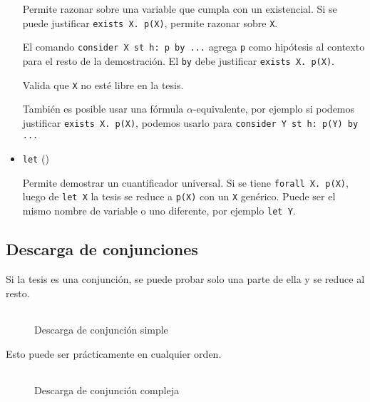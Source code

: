 \begin{itemize}
    Permite razonar sobre una variable que cumpla con un existencial. Si se
    puede justificar \lstinline{exists X. p(X)}, permite razonar sobre
    \lstinline{X}.

    El comando \lstinline{consider X st h: p by ...} agrega \lstinline{p} como
    hipótesis al contexto para el resto de la demostración. El \lstinline{by}
    debe justificar \lstinline{exists X. p(X)}.

    Valida que \lstinline{X} no esté libre en la tesis.

    También es posible usar una fórmula $\alpha$-equivalente, por
    ejemplo si podemos justificar \lstinline{exists X. p(X)}, podemos usarlo
    para \lstinline{consider Y st h: p(Y) by ...}

    \item \lstinline{let} ()
    
    Permite demostrar un cuantificador universal. Si se tiene
    \lstinline{forall X. p(X)}, luego de \lstinline{let X} la tesis se reduce a
    \lstinline{p(X)} con un \lstinline{X} genérico. Puede ser el mismo nombre de
    variable o uno diferente, por ejemplo \lstinline{let Y}.

\end{itemize}

\subsection{Descarga de conjunciones}\label{ppa:sec:and-intro}

Si la tesis es una conjunción, se puede probar solo una parte de ella y se
reduce al resto.

\begin{figure}[H]
    \centering
    \caption{Descarga de conjunción simple}
    \begin{tabular}{c}
        
    \end{tabular}
\end{figure}

Esto puede ser prácticamente en cualquier orden.

\begin{figure}[H]
    \centering
    \caption{Descarga de conjunción compleja}
    \begin{tabular}{c}
    
    \end{tabular}
\end{figure}


